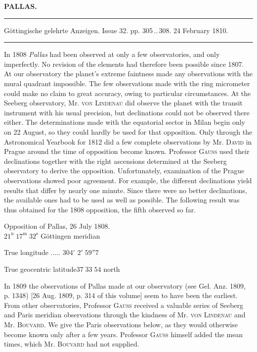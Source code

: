 \clearpage{}

\begin{center}\textbf{PALLAS.}\par\vspace{4pt}\hrule\vspace{4pt}\fontsize{10}{12}\selectfont Göttingische gelehrte Anzeigen. Issue 32. pp. 305\,..\,308. 24 February 1810.\par\vspace{4pt}\hrule\vspace{4pt}\end{center}

\par\indent In 1808 \emph{Pallas} had been observed at only a few observatories, and only imperfectly. No revision of the elements had therefore been possible since 1807. At our observatory the planet’s extreme faintness made any observations with the mural quadrant impossible. The few observations made with the ring micrometer could make no claim to great accuracy, owing to particular circumstances. At the Seeberg observatory, Mr. \textsc{von Lindenau} did observe the planet with the transit instrument with his usual precision, but declinations could not be observed there either. The determinations made with the equatorial sector in Milan begin only on 22 August, so they could hardly be used for that opposition. Only through the Astronomical Yearbook for 1812 did a few complete observations by Mr. \textsc{David} in Prague around the time of opposition become known. Professor \textsc{Gauss} used their declinations together with the right ascensions determined at the Seeberg observatory to derive the opposition. Unfortunately, examination of the Prague observations showed poor agreement. For example, the different declinations yield results that differ by nearly one minute. Since there were no better declinations, the available ones had to be used as well as possible. The following result was thus obtained for the 1808 opposition, the fifth observed so far.

\begin{center}Opposition of Pallas, 26 July 1808.\\$21^{\text{u}}\;17^{\text{m}}\;32^{\text{s}}$ Göttingen meridian\par True longitude .\;.\;.\;.\;.\; $304^\circ\;2'\;59''7$\par True geocentric latitude\quad $37\;33\;54$ north\end{center}

\par\indent In 1809 the observations of Pallas made at our observatory (see Gel. Anz. 1809, p. 1348) [26 Aug. 1809, p. 314 of this volume] seem to have been the earliest. From other observatories, Professor \textsc{Gauss} received a valuable series of Seeberg and Paris meridian observations through the kindness of Mr. \textsc{von Lindenau} and Mr. \textsc{Bouvard}. We give the Paris observations below, as they would otherwise become known only after a few years. Professor \textsc{Gauss} himself added the mean times, which Mr. \textsc{Bouvard} had not supplied.

